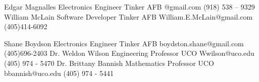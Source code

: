 %
%
%

\textbf{}

\begin{referees}
		{Edgar Magnalles}
		{Electronics Engineer}
		{Tinker AFB}
		{@gmail.com }
		{(918) 538 – 9329}
	    {William McLain}
	    {Software Developer}
	    {Tinker AFB}
	    { William.E.McLain@gmail.com}
	    {(405)414-6092}

	   
	    {Shane Boydson}
	    {Electronics Engineer}
	    {Tinker AFB}
	    {boydston.shane@gmail.com}
	    {(405)696-2403}
		{Dr. Weldon Wilson}
		{Engineering Professor}
		{UCO}
		{Wwilson@uco.edu}
		{(405) 974 - 5470}
		{Dr. Brittany Bannish}
		{Mathematics Professor}
		{UCO}
		{bbannish@uco.edu }
		{(405) 974 - 5441}
\end{referees}